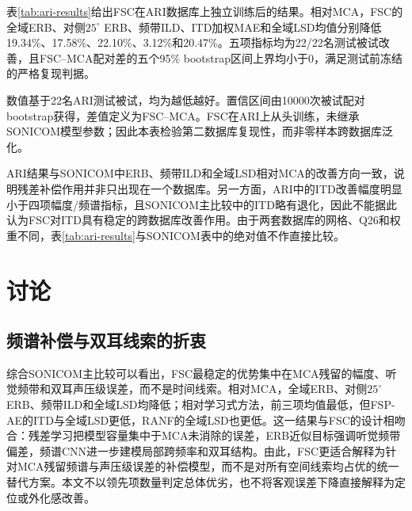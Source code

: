 \documentclass[UTF8,a4paper]{article}
\begin{document}
表\ref{tab:ari-results}给出FSC在ARI数据库上独立训练后的结果。相对MCA，FSC的全域ERB、对侧$25^\circ$ ERB、频带ILD、ITD加权MAE和全域LSD均值分别降低19.34\%、17.58\%、22.10\%、3.12\%和20.47\%。五项指标均为22/22名测试被试改善，且FSC--MCA配对差的五个95\% bootstrap区间上界均小于0，满足测试前冻结的严格复现判据。

\begin{table}[htbp]
\centering\small
\setlength{\tabcolsep}{3.2pt}
\par\smallskip
\parbox{\linewidth}{\footnotesize 数值基于22名ARI测试被试，均为越低越好。置信区间由10000次被试配对bootstrap获得，差值定义为FSC--MCA。FSC在ARI上从头训练，未继承SONICOM模型参数；因此本表检验第二数据库复现性，而非零样本跨数据库泛化。}
\end{table}

ARI结果与SONICOM中ERB、频带ILD和全域LSD相对MCA的改善方向一致，说明残差补偿作用并非只出现在一个数据库。另一方面，ARI中的ITD改善幅度明显小于四项幅度/频谱指标，且SONICOM主比较中的ITD略有退化，因此不能据此认为FSC对ITD具有稳定的跨数据库改善作用。由于两套数据库的网格、Q26和权重不同，表\ref{tab:ari-results}与SONICOM表中的绝对值不作直接比较。

\section{讨论}
\label{sec:discussion}

\subsection{频谱补偿与双耳线索的折衷}
综合SONICOM主比较可以看出，FSC最稳定的优势集中在MCA残留的幅度、听觉频带和双耳声压级误差，而不是时间线索。相对MCA，全域ERB、对侧$25^\circ$ ERB、频带ILD和全域LSD均降低；相对学习式方法，前三项均值最低，但FSP-AE的ITD与全域LSD更低，RANF的全域LSD也更低。这一结果与FSC的设计相吻合：残差学习把模型容量集中于MCA未消除的误差，ERB近似目标强调听觉频带偏差，频谱CNN进一步建模局部跨频率和双耳结构。由此，FSC更适合解释为针对MCA残留频谱与声压级误差的补偿模型，而不是对所有空间线索均占优的统一替代方案。本文不以领先项数量判定总体优劣，也不将客观误差下降直接解释为定位或外化感改善。
\end{document}
